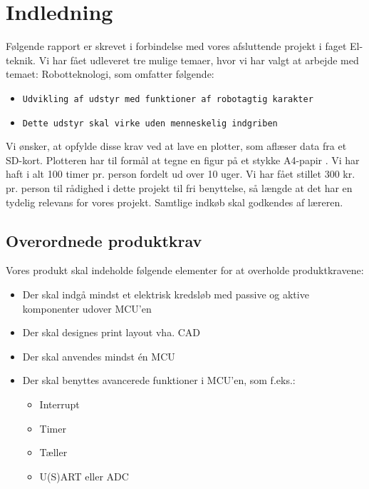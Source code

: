 \chapter{Indledning}
\label{ch:indledning}


Følgende rapport er skrevet i forbindelse med vores afsluttende
projekt i faget El-teknik.  Vi har fået udleveret tre mulige temaer,
hvor vi har valgt at arbejde med temaet: Robotteknologi, som omfatter
følgende:

\begin{itemize}
\item \texttt{Udvikling af udstyr med funktioner af robotagtig karakter}
\item \texttt{Dette udstyr skal virke uden menneskelig indgriben}
\end{itemize}

Vi ønsker, at opfylde disse krav ved at lave en plotter, som aflæser
data fra et SD-kort. Plotteren har til formål at tegne en figur på et
stykke A4-papir . Vi
har haft i alt 100 timer pr. person fordelt ud over 10 uger. Vi har
fået stillet 300 kr. pr. person til rådighed i dette projekt til fri
benyttelse, så længde at det har en tydelig relevans for vores
projekt. Samtlige indkøb skal godkendes af læreren.


\section{Overordnede produktkrav}

Vores produkt skal indeholde følgende elementer for at overholde
produktkravene:

\begin{itemize}
\item Der skal indgå mindst et elektrisk kredsløb med passive og
  aktive komponenter udover MCU'en
\item Der skal designes print layout vha. CAD
\item Der skal anvendes mindst én MCU
\item Der skal benyttes avancerede funktioner i MCU'en, som f.eks.:
  \begin{itemize}
  \item Interrupt
  \item Timer
  \item Tæller
  \item U(S)ART eller ADC
  \end{itemize}
\end{itemize}



